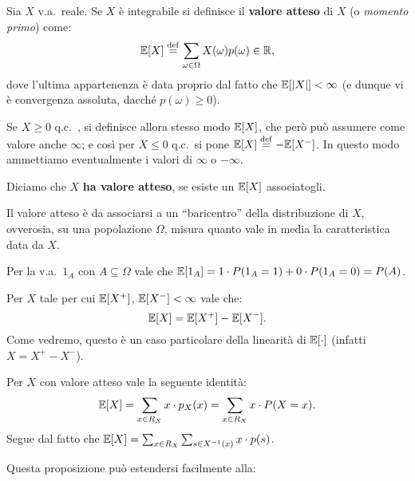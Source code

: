 \begin{multicols*}{2}
\begin{definition}
    Sia $X$ v.a.~reale. Se $X$ è integrabile si definisce
    il \textbf{valore atteso} di $X$ (o \textit{momento primo}) come:
    \[
        \mathbb{E}[X] \overset{\mathrm{def}}{=} \sum_{\omega \in \Omega} X(\omega) p(\omega) \in \mathbb{R},
    \]
    dove l'ultima appartenenza è data proprio dal fatto che $\mathbb{E}[\left\lvert X \right\rvert] < \infty$ (e
    dunque vi è convergenza assoluta, dacché $p(\omega) \geq 0$). \smallskip

    Se $X \geq 0$ q.c.~, si definisce allora stesso modo $\mathbb{E}[X]$, che però può assumere come
    valore anche $\infty$; e così per $X \leq 0$ q.c.~si pone
    $\mathbb{E}[X] \overset{\mathrm{def}}{=} -\mathbb{E}[X^-]$. In questo modo ammettiamo eventualmente i valori
    di $\infty$ o $-\infty$. \smallskip

    Diciamo che $X$ \textbf{ha valore atteso}, se esiste un $\mathbb{E}[X]$ associatogli.
\end{definition}

\begin{remark}
    Il valore atteso è da associarsi a un ``baricentro'' della distribuzione di
    $X$, ovverosia, su una popolazione $\Omega$, misura quanto vale in media
    la caratteristica data da $X$.
\end{remark}

\begin{remark}
    Per la v.a.~$1_A$ con $A \subseteq \Omega$ vale che
    $\mathbb{E}[1_A] = 1 \cdot P(1_A = 1) + 0 \cdot P (1_A = 0) = P(A)$.
\end{remark}

\begin{remark}
    Per $X$ tale per cui $\mathbb{E}[X^+]$, $\mathbb{E}[X^-] < \infty$ vale che:
    \[
        \mathbb{E}[X] = \mathbb{E}[X^+] - \mathbb{E}[X^-].
    \]
    Come vedremo, questo è un caso particolare della linearità di $\mathbb{E}[\cdot]$
    (infatti $X = X^+ - X^-$).
\end{remark}

\begin{lemma}
    Per $X$ con valore atteso vale la seguente identità:
    \[
        \mathbb{E}[X] = \sum_{x \in R_X} x \cdot p_X(x) = \sum_{x \in R_X} x \cdot P(X = x).
    \]
    Segue dal fatto che $\mathbb{E}[X] = \sum_{x \in R_X} \sum_{s \in X^{-1}(x)} x \cdot p(s)$.
\end{lemma}

Questa proposizione può estendersi facilmente alla:


\end{multicols*}
